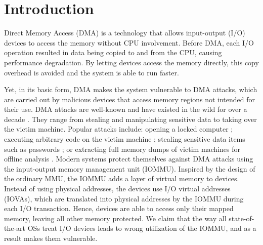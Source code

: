\section{Introduction}
Direct Memory Access (DMA) is a technology that allows input-output (I/O) devices to access the memory without CPU involvement. Before DMA, each I/O operation resulted in data being copied to and from the CPU, causing performance degradation. By letting devices access the memory directly, this copy overhead is avoided and the system is able to run faster. 

Yet, in its basic form, DMA makes the system vulnerable to DMA attacks, which are carried out by malicious devices that access memory regions not intended for their use. DMA attacks are well-known and have existed in the wild for over a decade \cite{Dor04,BDK10,thunder}. They range from stealing and manipulating sensitive data to taking over the victim machine. Popular attacks include: opening a locked computer \cite{MM, Fin14}; executing arbitrary code on the victim machine \cite{Fri16, Woj08, AD10,thunder}; stealing sensitive data items such as passwords \cite{SB12, LKV13, Cim16, BR12}; or extracting full memory dumps of victim machines for offline analysis \cite{MM, Vol, Fin14, GA10}. Modern systems protect themselves against DMA attacks using the input-output memory management unit (IOMMU). Inspired by the design of the ordinary MMU, the IOMMU adds a layer of virtual memory to devices. Instead of using physical addresses, the devices use I/O virtual addresses (IOVAs), which are translated into physical addresses by the IOMMU during each I/O transaction. Hence, devices are able to access only their mapped memory, leaving all other memory protected. 
We claim that the way all state-of-the-art OSs treat I/O devices leads to wrong utilization of the IOMMU, and as a result makes them vulnerable. 
\newline 
